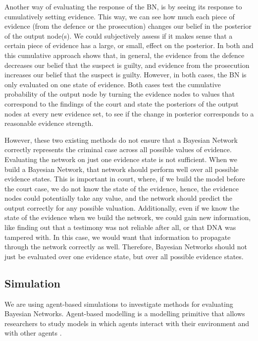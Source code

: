 \documentclass[12pt]{article}
\begin{document}
\begin{enumerate}
Another way of evaluating the response of the BN, is by seeing its response to cumulatively setting evidence. This way, we can see how much each piece of evidence (from the defence or the prosecution) changes our belief in the posterior of the output node(s). We could subjectively assess if it makes sense that a certain piece of evidence has a large, or small, effect on the posterior. In both \citep{Fenton2019} and \citep{vlek2016} this cumulative approach shows that, in general, the evidence from the defence decreases our belief that the suspect is guilty, and evidence from the prosecution increases our belief that the suspect is guilty. However, in both cases, the BN is only evaluated on one state of evidence. Both cases test the cumulative probability of the output node by turning the evidence nodes to values that correspond to the findings of the court and state the posteriors of the output nodes at every new evidence set, to see if the change in posterior corresponds to a reasonable evidence strength.



\end{enumerate}

However, these two existing methods do not ensure that a Bayesian Network correctly represents the criminal case across all possible values of evidence. Evaluating the network on just one evidence state is not sufficient. When we build a Bayesian Network, that network should perform well over all possible evidence states. This is important in court, where, if we build the model before the court case, we do not know the state of the evidence, hence, the evidence nodes could potentially take any value, and the network should predict the output correctly for any possible valuation. Additionally, even if we know the state of the evidence when we build the network, we could gain new information, like finding out that a testimony was not reliable after all, or that DNA was tampered with. In this case, we would want that information to propagate through the network correctly as well. Therefore, Bayesian Networks should not just be evaluated over one evidence state, but over all possible evidence states.


\subsection{Simulation}

We are using agent-based simulations to investigate methods for evaluating Bayesian Networks. Agent-based modelling is a modelling primitive that allows researchers to study models in which agents interact with their environment and with other agents \citep{gilbert2000}. 
\end{document}
